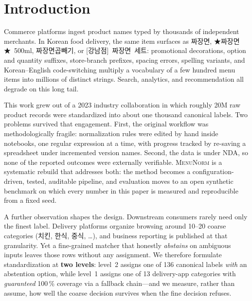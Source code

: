 \documentclass[10pt,twocolumn]{article}
\newcommand{\menunorm}{\textsc{MenuNorm}}
\begin{document}
\section{Introduction}

Commerce platforms ingest product names typed by thousands of independent
merchants. In Korean food delivery, the same item surfaces as
\mbox{짜장면}, \mbox{★짜장면★ 500ml}, \mbox{짜장면곱빼기}, or
\mbox{[강남점] 짜장면 세트}: promotional decorations, option and quantity
suffixes, store-branch prefixes, spacing errors, spelling variants, and
Korean--English code-switching multiply a vocabulary of a few hundred menu
items into millions of distinct strings. Search, analytics, and
recommendation all degrade on this long tail.

This work grew out of a 2023 industry collaboration in which roughly 20M raw
product records were standardized into about one thousand canonical labels.
Two problems survived that engagement. First, the original workflow was
methodologically fragile: normalization rules were edited by hand inside
notebooks, one regular expression at a time, with progress tracked by
re-saving a spreadsheet under incremented version names. Second, the data is
under NDA, so none of the reported outcomes were externally verifiable.
\menunorm{} is a systematic rebuild that addresses both: the method becomes a
configuration-driven, tested, auditable pipeline, and evaluation moves to an
open synthetic benchmark on which every number in this paper is measured and
reproducible from a fixed seed.

A further observation shapes the design. Downstream consumers rarely need
only the finest label. Delivery platforms organize browsing around 10--20
coarse categories (치킨, 한식, 중식, \dots), and business reporting is
published at that granularity. Yet a fine-grained matcher that honestly
\emph{abstains} on ambiguous inputs leaves those rows without any assignment.
We therefore formulate standardization at \textbf{two levels}: level~2
assigns one of 136 canonical labels \emph{with} an abstention option, while
level~1 assigns one of 13 delivery-app categories with \emph{guaranteed}
100\,\% coverage via a fallback chain---and we measure, rather than assume,
how well the coarse decision survives when the fine decision refuses.
\end{document}
